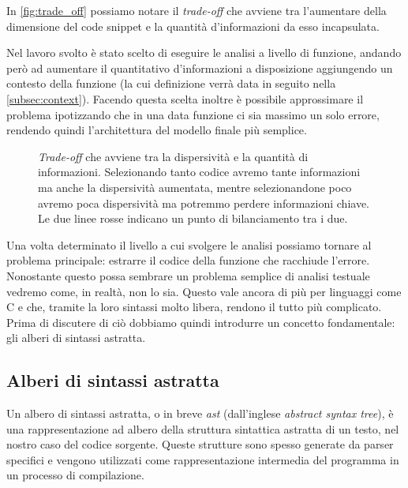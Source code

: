 In \autoref{fig:trade_off} possiamo notare il \textit{trade-off} che avviene tra l'aumentare della dimensione del code snippet e la quantità d'informazioni da esso incapsulata. 

Nel lavoro svolto è stato scelto di eseguire le analisi a livello di funzione, andando però ad aumentare il quantitativo d'informazioni a disposizione aggiungendo un contesto della funzione (la cui definizione verrà data in seguito nella \autoref{subsec:context}). 
Facendo questa scelta inoltre è possibile approssimare il problema ipotizzando che in una data funzione ci sia massimo un solo errore, rendendo quindi l'architettura del modello finale più semplice.

\begin{figure}
  \centering
  \caption{\textit{Trade-off} che avviene tra la dispersività e la quantità di informazioni. Selezionando tanto codice avremo tante informazioni ma anche la dispersività aumentata, mentre selezionandone poco avremo poca dispersività ma potremmo perdere informazioni chiave.
    Le due linee rosse indicano un punto di bilanciamento tra i due.
  }
  \label{fig:trade_off}
\end{figure}

Una volta determinato il livello a cui svolgere le analisi possiamo tornare al problema principale: estrarre il codice della funzione che racchiude l'errore. 
Nonostante questo possa sembrare un problema semplice di analisi testuale vedremo come, in realtà, non lo sia.
Questo vale ancora di più per linguaggi come C e \CPP{} che, tramite la loro sintassi molto libera, rendono il tutto più complicato.
Prima di discutere di ciò dobbiamo quindi introdurre un concetto fondamentale: gli alberi di sintassi astratta.


\subsection{Alberi di sintassi astratta}
Un albero di sintassi astratta, o in breve \textit{ast} (dall'inglese \textit{abstract syntax tree}), è una rappresentazione ad albero della struttura sintattica astratta di un testo, nel nostro caso del codice sorgente.
Queste strutture sono spesso generate da parser specifici e vengono utilizzati come rappresentazione intermedia del programma in un processo di compilazione.

